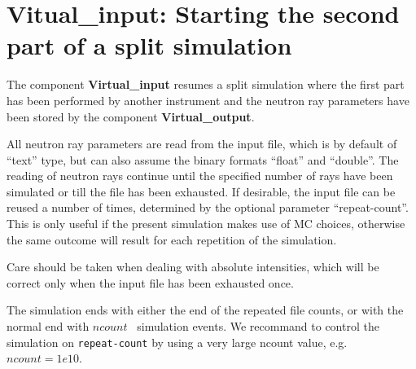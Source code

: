 \section{Vitual\_input: Starting the second part of a split simulation}
\label{virtual_input}


The component {\bf Virtual\_input} resumes a split simulation where the
first part has been performed by another instrument and the neutron ray
parameters have been stored by the component {\bf Virtual\_output}.

All neutron ray parameters are read from the input file, which is by default
of ``text'' type, but can also assume the binary formats
``float'' and ``double''. The reading of neutron rays continue until the
specified number of rays have been simulated or
till the file has been exhausted. If desirable, the input file
can be reused a number of times, determined by the optional parameter
``repeat-count''. This is only useful if the present simulation makes use of 
MC choices, otherwise the same outcome will result for each repetition of the
simulation.

Care should be taken when dealing with
absolute intensities, which will be correct only
when the input file has been exhausted once.

The simulation ends with either the end of the repeated file counts, 
or with the normal end with $ncount$ \MCS\ simulation events. We recommand to 
control the simulation on \verb+repeat-count+ by using
a very large ncount value, e.g. $ncount=1e10$.
